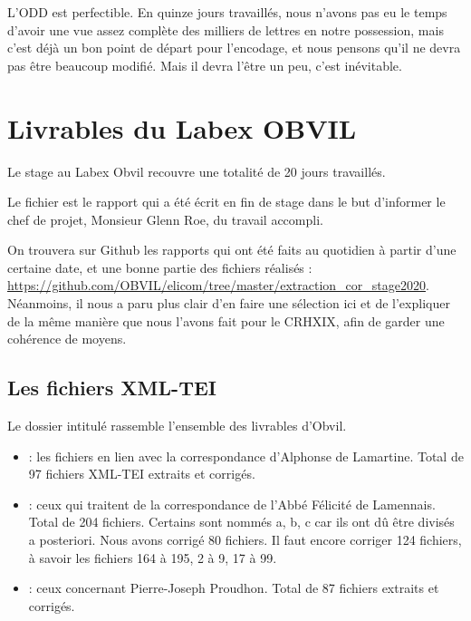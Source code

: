 L'ODD est perfectible. En quinze jours travaillés, nous n'avons pas eu le temps d'avoir une vue assez complète des milliers de lettres en notre possession, mais c'est déjà un bon point de départ pour l'encodage, et nous pensons qu'il ne devra pas être beaucoup modifié. Mais il devra l'être un peu, c'est inévitable.

\chapter{Livrables du Labex OBVIL}


Le stage au Labex Obvil recouvre une totalité de 20 jours travaillés.

Le fichier  est le rapport qui a été écrit en fin de stage dans le but d'informer le chef de projet, Monsieur Glenn Roe, du travail accompli.

On trouvera sur Github les rapports qui ont été faits au quotidien à partir d'une certaine date, et une bonne partie des fichiers réalisés : \url{https://github.com/OBVIL/elicom/tree/master/extraction\_cor\_stage2020}. 
Néanmoins, il nous a paru plus clair d'en faire une sélection ici et de l'expliquer de la même manière que nous l'avons fait pour le CRHXIX, afin de garder une cohérence de moyens.

\section{Les fichiers XML-TEI}

Le dossier intitulé  rassemble l'ensemble des livrables d'Obvil.
\begin{itemize}
    \item {} : les fichiers en lien avec la correspondance d'Alphonse de Lamartine. Total de 97 fichiers XML-TEI extraits et corrigés.
    \item {} : ceux qui traitent de la correspondance de l'Abbé Félicité de Lamennais. Total de 204 fichiers. Certains sont nommés a, b, c car ils ont dû être divisés a posteriori. Nous avons corrigé 80 fichiers. Il faut encore corriger 124 fichiers, à savoir les fichiers 164 à 195, 2 à 9, 17 à 99.
    \item {} : ceux concernant Pierre-Joseph Proudhon. Total de 87 fichiers extraits et corrigés.
\end{itemize}



